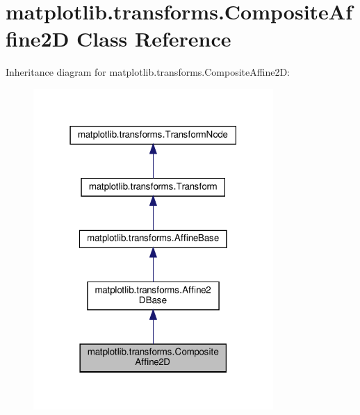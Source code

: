 \hypertarget{classmatplotlib_1_1transforms_1_1CompositeAffine2D}{}\section{matplotlib.\+transforms.\+Composite\+Affine2D Class Reference}
\label{classmatplotlib_1_1transforms_1_1CompositeAffine2D}


Inheritance diagram for matplotlib.\+transforms.\+Composite\+Affine2D\+:
\nopagebreak
\begin{figure}[H]
\begin{center}
\leavevmode
\includegraphics[width=259pt]{classmatplotlib_1_1transforms_1_1CompositeAffine2D__inherit__graph}
\end{center}
\end{figure}


